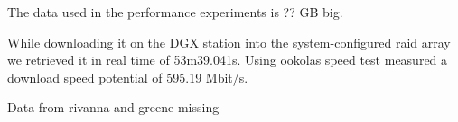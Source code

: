 \documentclass[sigplan,screen]{acmart}
\begin{document}

The data used in the performance experiments is ?? GB big. 

While downloading it on the DGX station into the system-configured raid array we retrieved it in real time of 53m39.041s. Using ookolas speed test measured a download speed potential of 595.19 Mbit/s.

Data from rivanna and greene missing

\end{document}
